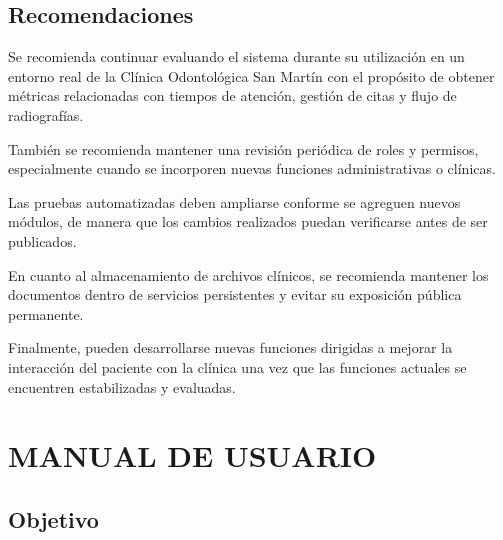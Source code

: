 \section{Recomendaciones}

Se recomienda continuar evaluando el sistema durante su utilización en un
entorno real de la Clínica Odontológica San Martín con el propósito de
obtener métricas relacionadas con tiempos de atención, gestión de citas y
flujo de radiografías.

También se recomienda mantener una revisión periódica de roles y permisos,
especialmente cuando se incorporen nuevas funciones administrativas o
clínicas.

Las pruebas automatizadas deben ampliarse conforme se agreguen nuevos
módulos, de manera que los cambios realizados puedan verificarse antes de
ser publicados.

En cuanto al almacenamiento de archivos clínicos, se recomienda mantener
los documentos dentro de servicios persistentes y evitar su exposición
pública permanente.

Finalmente, pueden desarrollarse nuevas funciones dirigidas a mejorar la
interacción del paciente con la clínica una vez que las funciones actuales
se encuentren estabilizadas y evaluadas.



\clearpage

\printbibliography[
heading=bibintoc,
title={BIBLIOGRAFÍA CONSULTADA}
]



\clearpage
\appendix




\chapter{MANUAL DE USUARIO}

\section*{Objetivo}

